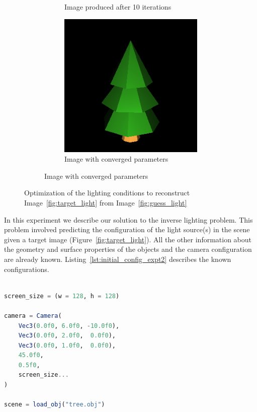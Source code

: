 \documentclass{juliacon}
\begin{document}
\begin{figure}[!htb]
\begin{subfigure}[c]{0.45\textwidth}
\begin{subfigure}[c]{0.45\textwidth}
            \caption{Image produced after 10 iterations}
        \end{subfigure}
        \hfill
        \begin{subfigure}[c]{0.45\textwidth}
            \centering
            \includegraphics[width=\textwidth]{images/light/501.png}
            \caption{Image with converged parameters}
        \end{subfigure}
    \end{subfigure}
    \caption{Optimization of the lighting conditions to reconstruct Image~\ref{fig:target_light} from Image~\ref{fig:guess_light}}
    \label{fig:light_position}
\end{figure}

In this experiment we describe our solution to the inverse lighting problem. This problem involved predicting the configuration of the light source(s) in the scene given a target image (Figure~\ref{fig:target_light}). All the other information about the geometry and surface properties of the objects and the camera configuration are already known. Listing~\ref{lst:initial_config_expt2} describes the known configurations.

\noindent
\begin{minipage}{\linewidth}
\begin{lstlisting}[caption = {Configuration of the Scene for Experiment~\ref{sec:light_source}},
                   label = {lst:initial_config_expt2},
                   captionpos = b,
                   language = Julia]

screen_size = (w = 128, h = 128)

camera = Camera(
    Vec3(0.0f0, 6.0f0, -10.0f0),
    Vec3(0.0f0, 2.0f0,  0.0f0),
    Vec3(0.0f0, 1.0f0,  0.0f0),
    45.0f0,
    0.5f0,
    screen_size...
)

scene = load_obj("tree.obj")
\end{lstlisting}
\end{minipage}
\end{document}
